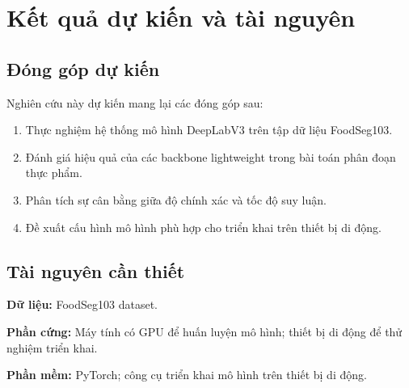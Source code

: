 \section{Kết quả dự kiến và tài nguyên}
\label{results}

\subsection{Đóng góp dự kiến}

Nghiên cứu này dự kiến mang lại các đóng góp sau:
\begin{enumerate}
    \item Thực nghiệm hệ thống mô hình DeepLabV3 trên tập dữ liệu FoodSeg103.
    \item Đánh giá hiệu quả của các backbone lightweight trong bài toán phân đoạn thực phẩm.
    \item Phân tích sự cân bằng giữa độ chính xác và tốc độ suy luận.
    \item Đề xuất cấu hình mô hình phù hợp cho triển khai trên thiết bị di động.
\end{enumerate}

\subsection{Tài nguyên cần thiết}

\textbf{Dữ liệu:} FoodSeg103 dataset.

\textbf{Phần cứng:} Máy tính có GPU để huấn luyện mô hình; thiết bị di động để thử nghiệm triển khai.

\textbf{Phần mềm:} PyTorch; công cụ triển khai mô hình trên thiết bị di động.
